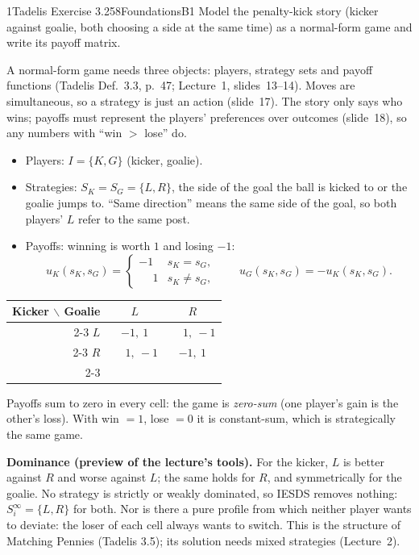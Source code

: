 \begin{exsol}{1}{Tadelis Exercise 3.2}{58}{Foundations}{B1}
\asked Model the penalty-kick story (kicker against goalie, both choosing a side at the same
time) as a normal-form game and write its payoff matrix.

\method A normal-form game needs three objects: players, strategy sets and payoff functions
(Tadelis Def.~3.3, p.~47; Lecture~1, slides~13--14). Moves are simultaneous, so a strategy is
just an action (slide~17). The story only says who wins; payoffs must represent the players'
preferences over outcomes (slide~18), so any numbers with ``win $>$ lose'' do.

\solution
\begin{itemize}
  \item Players: $I = \{K, G\}$ (kicker, goalie).
  \item Strategies: $S_K = S_G = \{L, R\}$, the side of the goal the ball is kicked to or the
  goalie jumps to. ``Same direction'' means the same side of the goal, so both players' $L$
  refer to the same post.
  \item Payoffs: winning is worth $1$ and losing $-1$:
  \[
    u_K(s_K, s_G) = \begin{cases} -1 & s_K = s_G,\\ \phantom{-}1 & s_K \ne s_G,\end{cases}
    \qquad u_G(s_K, s_G) = -u_K(s_K, s_G).
  \]
\end{itemize}
\begin{center}
\begin{tabular}{r|c|c|}
\multicolumn{1}{r}{Kicker $\backslash$ Goalie} & \multicolumn{1}{c}{$L$} & \multicolumn{1}{c}{$R$}\\ \cline{2-3}
$L$ & $-1,\ 1$ & $\phantom{-}1,\ -1$ \\ \cline{2-3}
$R$ & $\phantom{-}1,\ -1$ & $-1,\ 1$ \\ \cline{2-3}
\end{tabular}
\end{center}
Payoffs sum to zero in every cell: the game is \emph{zero-sum} (one player's gain is the other's
loss). With win $=1$, lose $=0$ it is constant-sum, which is strategically the same game.

\textbf{Dominance (preview of the lecture's tools).} For the kicker, $L$ is better against $R$
and worse against $L$; the same holds for $R$, and symmetrically for the goalie. No strategy is
strictly or weakly dominated, so IESDS removes nothing: $S_i^\infty = \{L, R\}$ for both. Nor is
there a pure profile from which neither player wants to deviate: the loser of each cell always
wants to switch. This is the structure of Matching Pennies (Tadelis 3.5); its solution needs
mixed strategies (Lecture~2).


\end{exsol}
